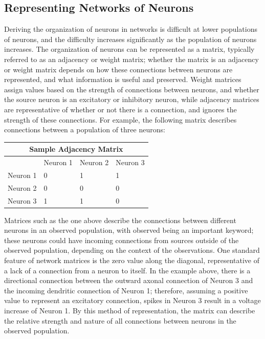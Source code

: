 \documentclass[11pt]{article}
\begin{document}
\subsection{Representing Networks of Neurons}
Deriving the organization of neurons in networks is difficult at lower populations of neurons, and the difficulty increases significantly as the population of neurons increases. The organization of neurons can be represented as a matrix, typically referred to as an adjacency or weight matrix; whether the matrix is an adjacency or weight matrix depends on how these connections between neurons are represented, and what information is useful and preserved. Weight matrices assign values based on the strength of connections between neurons, and whether the source neuron is an excitatory or inhibitory neuron, while adjacency matrices are representative of whether or not there is a connection, and ignores the strength of these connections. For example, the following matrix describes connections between a population of three neurons:\par

\begin{center}
\begin{tabular}{ |p{3cm}|p{3cm}|p{3cm}|p{3cm}|  }
 \hline
 \multicolumn{4}{|c|}{Sample Adjacency Matrix} \\
 \hline
  & Neuron 1 & Neuron 2 & Neuron 3\\
 \hline
 Neuron 1 & 0 & 1 & 1\\
 Neuron 2 & 0 & 0 & 0\\
 Neuron 3 & 1 & 1 & 0\\
 \hline
\end{tabular}
\end{center}

Matrices such as the one above describe the connections between different neurons in an observed population, with observed being an important keyword; these neurons could have incoming connections from sources outside of the observed population, depending on the context of the observations. One standard feature of network matrices is the zero value along the diagonal, representative of a lack of a connection from a neuron to itself. In the example above, there is a directional connection between the outward axonal connection of Neuron 3 and the incoming dendritic connection of Neuron 1; therefore, assuming a positive value to represent an excitatory connection, spikes in Neuron 3 result in a voltage increase of Neuron 1. By this method of representation, the matrix can describe the relative strength and nature of all connections between neurons in the observed population.\par
\end{document}
